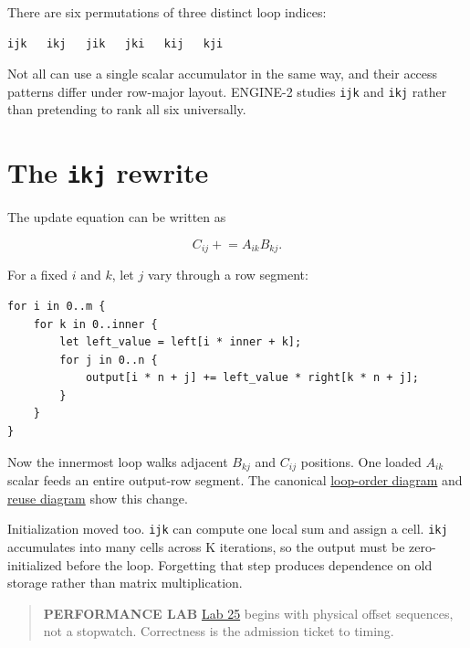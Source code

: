 There are six permutations of three distinct loop indices:

\begin{verbatim}
ijk   ikj   jik   jki   kij   kji
\end{verbatim}

Not all can use a single scalar accumulator in the same way, and their
access patterns differ under row-major layout. ENGINE-2 studies
\texttt{ijk} and \texttt{ikj} rather than pretending to rank all six
universally.

\section{\texorpdfstring{The \texttt{ikj}
rewrite}{The ikj rewrite}}\label{the-ikj-rewrite}

The update equation can be written as

\begin{equation}
C_{ij}\mathrel{+}=A_{ik}B_{kj}.
\end{equation}

For a fixed \(i\) and \(k\), let \(j\) vary through a row segment:

\begin{verbatim}
for i in 0..m {
    for k in 0..inner {
        let left_value = left[i * inner + k];
        for j in 0..n {
            output[i * n + j] += left_value * right[k * n + j];
        }
    }
}
\end{verbatim}

Now the innermost loop walks adjacent \(B_{kj}\) and \(C_{ij}\)
positions. One loaded \(A_{ik}\) scalar feeds an entire output-row
segment. The canonical
\href{https://github.com/hermonai/inside-the-llm-engine/blob/astra-visual-rewrite/diagrams/linear/loop-order-ijk-vs-ikj.txt}{loop-order
diagram} and
\href{https://github.com/hermonai/inside-the-llm-engine/blob/astra-visual-rewrite/diagrams/linear/follow-the-reuse.txt}{reuse
diagram} show this change.

Initialization moved too. \texttt{ijk} can compute one local sum and
assign a cell. \texttt{ikj} accumulates into many cells across K
iterations, so the output must be zero-initialized before the loop.
Forgetting that step produces dependence on old storage rather than
matrix multiplication.

\begin{quote}
\textbf{PERFORMANCE LAB}
\href{https://github.com/hermonai/inside-the-llm-engine/blob/astra-visual-rewrite/labs/lab-25-loop-order.md}{Lab
25} begins with physical offset sequences, not a stopwatch. Correctness
is the admission ticket to timing.
\end{quote}

